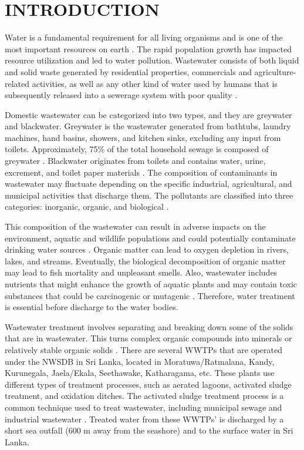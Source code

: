 \newpage
{}
\section{INTRODUCTION}
Water is a fundamental requirement for all living organisms and is one of the most important resources on earth \cite{Smarzewska2021}. The rapid population growth has impacted resource utilization and led to water pollution. Wastewater consists of both liquid and solid waste generated by residential properties,
commercials and agriculture-related activities, as well as any other kind of water used by humans that is subsequently released into a sewerage system
with poor quality \cite{Prasad2020}.

Domestic wastewater can be categorized into two types, and they are greywater and blackwater. Greywater is the wastewater generated from bathtubs, laundry machines, hand basins, showers, and kitchen sinks, excluding any input from toilets. Approximately, 75\% of the total household sewage is composed of greywater \cite{Eriksson2002}. Blackwater originates from toilets and contains water, urine, excrement, and toilet paper materials \cite{Paulo2013}. The composition of contaminants in wastewater may fluctuate depending on the specific industrial,
agricultural, and municipal activities that discharge them. The pollutants are classified into three categories: inorganic, organic, and biological \cite{Sangeetha2023}.

This composition of the wastewater can result in adverse impacts on the environment, aquatic and wildlife populations and could potentially contaminate drinking water sources \cite{Smarzewska2021}. Organic matter can lead to oxygen depletion in rivers, lakes, and streams. Eventually, the biological decomposition of organic matter may lead to fish mortality and unpleasant smells. Also, wastewater includes nutrients that might enhance the growth of aquatic plants and may contain toxic substances that could be carcinogenic or mutagenic \cite{Prasad2020}. Therefore, water treatment is essential before discharge to the water bodies.

Wastewater treatment involves separating and breaking down some of the solids that are in wastewater. This turns complex organic compounds into minerals or relatively stable organic solids \cite{Sonune2004}. There are several \ac{WWTP}s that are operated under the \ac{NWSDB} in Sri Lanka, located in Moratuwa/Ratmalana, Kandy, Kurunegala, Jaela/Ekala, Seethawake, Katharagama, etc. These plants use different types of treatment processes, such as aerated lagoons, activated sludge treatment, and oxidation ditches. The activated sludge treatment process is a common technique used to treat wastewater, including municipal sewage and industrial wastewater \cite{AGUILAR2013, Chukwu2018}. Treated water from these \ac{WWTP}s' is discharged by a short sea outfall (600 m away from the seashore) and to the surface water in Sri Lanka.

